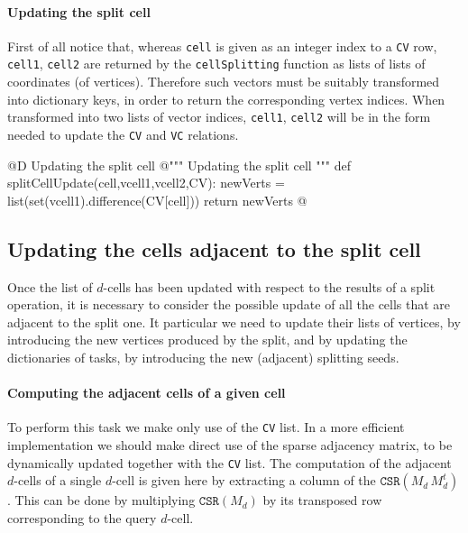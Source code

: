 \documentclass[11pt,oneside]{article}	%
\begin{document}
\paragraph{Updating the split cell} 
First of all notice that, whereas \texttt{cell} is given as an integer index to a \texttt{CV} row,
\texttt{cell1}, \texttt{cell2} are returned by the \texttt{cellSplitting} function as lists of lists of coordinates (of vertices). Therefore such vectors must be suitably transformed into dictionary keys, in order to return the corresponding vertex indices. When transformed into two lists of vector indices, \texttt{cell1}, \texttt{cell2} will be in the form needed to update the \texttt{CV} and \texttt{VC} relations.

@D Updating the split cell
@{""" Updating the split cell """
def splitCellUpdate(cell,vcell1,vcell2,CV):
	newVerts = list(set(vcell1).difference(CV[cell]))
	return newVerts
@}



\subsection{Updating the cells adjacent to the split cell}

Once the list of $d$-cells has been updated with respect to the results of a split operation, it is necessary to consider the possible update of all the cells that are adjacent to the split one.  It particular we need to update their lists of vertices, by introducing the new vertices produced by the split, and by updating the dictionaries of tasks, by introducing the new (adjacent) splitting seeds.

\paragraph{Computing the adjacent cells of a given cell}
To perform this task we make only use of the \texttt{CV} list. In a more efficient implementation we should make direct use of the sparse adjacency matrix, to be dynamically updated together with the \texttt{CV} list.
The computation of the adjacent $d$-cells of a single $d$-cell is given here by extracting a column of the $\texttt{CSR}(M_d\, M_d^t)$. This can be done by multiplying $\texttt{CSR}(M_d)$ by its transposed row corresponding to the query $d$-cell. 
\end{document}
